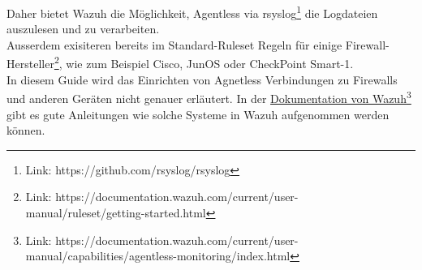Daher bietet Wazuh die Möglichkeit, Agentless via rsyslog\footnote{Link: https://github.com/rsyslog/rsyslog} die Logdateien auszulesen und zu verarbeiten.\\

Ausserdem exisiteren bereits im Standard-Ruleset Regeln für einige Firewall-Hersteller\footnote{Link: https://documentation.wazuh.com/current/user-manual/ruleset/getting-started.html}, wie zum Beispiel Cisco, JunOS oder CheckPoint Smart-1.\\

In diesem Guide wird das Einrichten von Agnetless Verbindungen zu Firewalls und anderen Geräten nicht genauer erläutert.
In der \href{https://documentation.wazuh.com/current/user-manual/capabilities/agentless-monitoring/index.html}{Dokumentation von Wazuh}\footnote{Link: https://documentation.wazuh.com/current/user-manual/capabilities/agentless-monitoring/index.html} gibt es gute Anleitungen wie solche Systeme in Wazuh aufgenommen werden können.